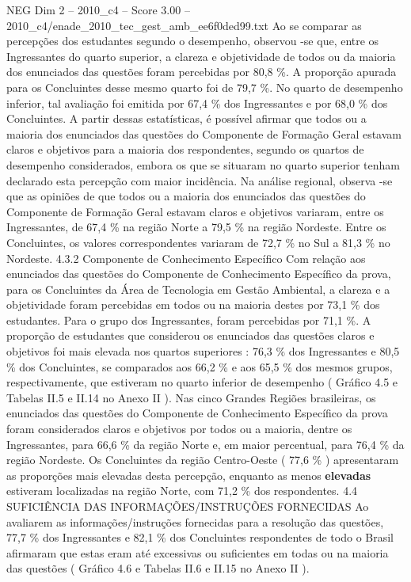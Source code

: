 \begin{textsample}{NEG Dim 2 – 2010\_c4 – Score 3.00 – 2010\_c4/enade\_2010\_tec\_gest\_amb\_ee6f0ded99.txt}
Ao se comparar as percepções dos estudantes segundo o desempenho, observou -se que, entre os Ingressantes do quarto superior, a clareza e objetividade de todos ou da maioria dos enunciados das questões foram percebidas por 80,8 \%.
A proporção apurada para os Concluintes desse mesmo quarto foi de 79,7 \%.
No quarto de desempenho inferior, tal avaliação foi emitida por 67,4 \% dos Ingressantes e por 68,0 \% dos Concluintes.
A partir dessas estatísticas, é possível afirmar que todos ou a maioria dos enunciados das questões do Componente de Formação Geral estavam claros e objetivos para a maioria dos respondentes, segundo os quartos de desempenho considerados, embora os que se situaram no quarto superior tenham declarado esta percepção com maior incidência.
Na análise regional, observa -se que as opiniões de que todos ou a maioria dos enunciados das questões do Componente de Formação Geral estavam claros e objetivos variaram, entre os Ingressantes, de 67,4 \% na região Norte a 79,5 \% na região Nordeste.
Entre os Concluintes, os valores correspondentes variaram de 72,7 \% no Sul a 81,3 \% no Nordeste. 4.3.2 Componente de Conhecimento Específico Com relação aos enunciados das questões do Componente de Conhecimento Específico da prova, para os Concluintes da Área de Tecnologia em Gestão Ambiental, a clareza e a objetividade foram percebidas em todos ou na maioria destes por 73,1 \% dos estudantes.
Para o grupo dos Ingressantes, foram percebidas por 71,1 \%.
A proporção de estudantes que considerou os enunciados das questões claros e objetivos foi mais elevada nos quartos superiores : 76,3 \% dos Ingressantes e 80,5 \% dos Concluintes, se comparados aos 66,2 \% e aos 65,5 \% dos mesmos grupos, respectivamente, que estiveram no quarto inferior de desempenho ( Gráfico 4.5 e Tabelas II.5 e II.14 no Anexo II ).
Nas cinco Grandes Regiões brasileiras, os enunciados das questões do Componente de Conhecimento Específico da prova foram considerados claros e objetivos por todos ou a maioria, dentre os Ingressantes, para 66,6 \% da região Norte e, em maior percentual, para 76,4 \% da região Nordeste.
Os Concluintes da região Centro-Oeste ( 77,6 \% ) apresentaram as proporções mais elevadas desta percepção, enquanto as menos \textbf{elevadas} estiveram localizadas na região Norte, com 71,2 \% dos respondentes. 4.4 SUFICIÊNCIA DAS INFORMAÇÕES/INSTRUÇÕES FORNECIDAS Ao avaliarem as informações/instruções fornecidas para a resolução das questões, 77,7 \% dos Ingressantes e 82,1 \% dos Concluintes respondentes de todo o Brasil afirmaram que estas eram até excessivas ou suficientes em todas ou na maioria das questões ( Gráfico 4.6 e Tabelas II.6 e II.15 no Anexo II ).

\end{textsample}

